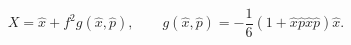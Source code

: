 \begin{equation}
\label{Eq:X-perturbation}
X=\hat x  + f^2 g(\hat x, \hat p), \qquad
g(\hat x,\hat p)=-\frac{1}{6}(1+
\hat x  \hat p  \hat x  \hat p )\hat x.
\end{equation}

